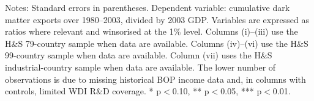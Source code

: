 \documentclass[11pt]{article}
\begin{document}
\small
\setcounter{table}{2}
\begin{table}[htbp]
\centering
\caption{Sources of Dark Matter: Cross-Section Evidence, cols (i)--(iii) --- corrected}
\label{tab:table3a_c}
\scriptsize
{}
\begin{minipage}{0.95\linewidth}
\footnotesize Notes: Standard errors in parentheses. Dependent variable: cumulative dark matter exports over 1980--2003, divided by 2003 GDP. Variables are expressed as ratios where relevant and winsorised at the 1\% level. Columns (i)--(iii) use the H\&S 79-country sample when data are available. Columns (iv)--(vi) use the H\&S 99-country sample when data are available. Column (vii) uses the H\&S industrial-country sample when data are available. The lower number of observations is due to missing historical BOP income data and, in columns with controls, limited WDI R\&D coverage. * p$<$0.10, ** p$<$0.05, *** p$<$0.01.
\end{minipage}
\end{table}
\end{document}
